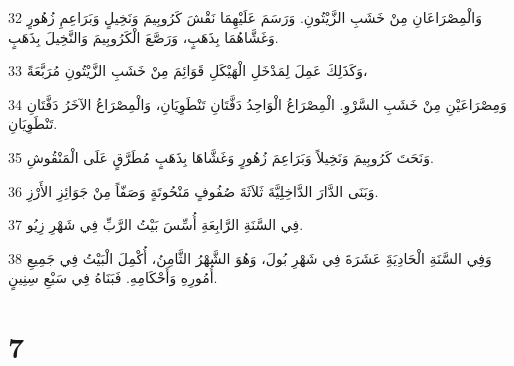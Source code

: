 \par 32 وَالْمِصْرَاعَانِ مِنْ خَشَبِ الزَّيْتُونِ. وَرَسَمَ عَلَيْهِمَا نَقْشَ كَرُوبِيمَ وَنَخِيلٍ وَبَرَاعِمِ زُهُورٍ وَغَشَّاهُمَا بِذَهَبٍ، وَرَصَّعَ الْكَرُوبِيمَ وَالنَّخِيلَ بِذَهَبٍ.
\par 33 وَكَذَلِكَ عَمِلَ لِمَدْخَلِ الْهَيْكَلِ قَوَائِمَ مِنْ خَشَبِ الزَّيْتُونِ مُرَبَّعَةً،
\par 34 وَمِصْرَاعَيْنِ مِنْ خَشَبِ السَّرْوِ. الْمِصْرَاعُ الْوَاحِدُ دَفَّتَانِ تَنْطَوِيَانِ، وَالْمِصْرَاعُ الآخَرُ دَفَّتَانِ تَنْطَوِيَانِ.
\par 35 وَنَحَتَ كَرُوبِيمَ وَنَخِيلاً وَبَرَاعِمَ زُهُورٍ وَغَشَّاهَا بِذَهَبٍ مُطَرَّقٍ عَلَى الْمَنْقُوشِ.
\par 36 وَبَنَى الدَّارَ الدَّاخِلِيَّةَ ثَلاَثَةَ صُفُوفٍ مَنْحُوتَةٍ وَصَفّاً مِنْ جَوَائِزِ الأَرْزِ.
\par 37 فِي السَّنَةِ الرَّابِعَةِ أُسِّسَ بَيْتُ الرَّبِّ فِي شَهْرِ زِيُو.
\par 38 وَفِي السَّنَةِ الْحَادِيَةَِ عَشَرَةَ فِي شَهْرِ بُولَ، وَهُوَ الشَّهْرُ الثَّامِنُ، أُكْمِلَ الْبَيْتُ فِي جَمِيعِ أُمُورِهِ وَأَحْكَامِهِ. فَبَنَاهُ فِي سَبْعِ سِنِينٍ.

\chapter{7}

